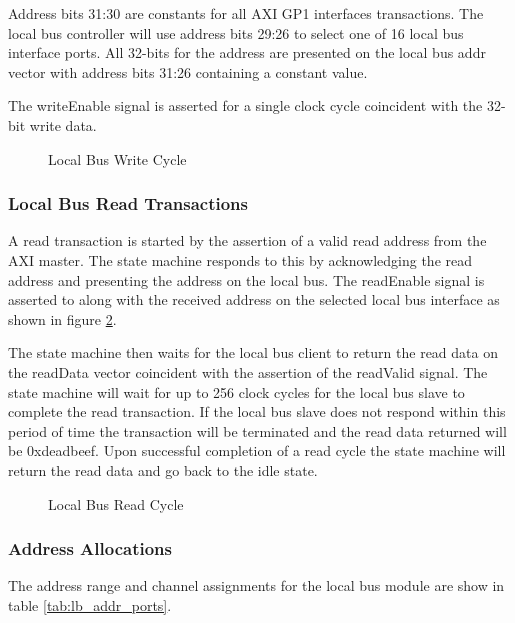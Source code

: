 \documentclass[11pt]{article}
\begin{document}
Address bits 31:30 are constants for all AXI GP1 interfaces transactions. The local bus controller will use address bits 29:26 to select one of
16 local bus interface ports. All 32-bits for the address are presented on the local bus addr vector with address bits 31:26 containing a constant
value.

The writeEnable signal is asserted for a single clock cycle coincident with the 32-bit write data. 

\begin{figure}[H]
   \centering
   \caption{Local Bus Write Cycle}
   \label{fig:lb_write_cycle}
\end{figure}

\subsubsection{Local Bus Read Transactions}

A read transaction is started by the assertion of a valid read address from the AXI master. The state machine responds to this by 
acknowledging the read address and presenting the address on the local bus. The readEnable signal is asserted to along with the 
received address on the selected local bus interface as shown in figure \ref{fig:lb_read_cycle}. 

The state machine then waits for the local bus client to return the read data on the readData vector coincident with the assertion 
of the readValid signal. The state machine will wait for up to 256 clock cycles for the local bus slave to complete the read transaction. 
If the local bus slave does not respond within this period of time the transaction will be terminated and the read data returned will be 
0xdeadbeef. Upon successful completion of a read cycle the state machine will return the read data and go back to the idle state. 

\begin{figure}[H]
   \centering
   \caption{Local Bus Read Cycle}
   \label{fig:lb_read_cycle}
\end{figure}

\subsubsection{Address Allocations}

The address range and channel assignments for the local bus module are show in table \ref{tab:lb_addr_ports}. 
\end{document}
